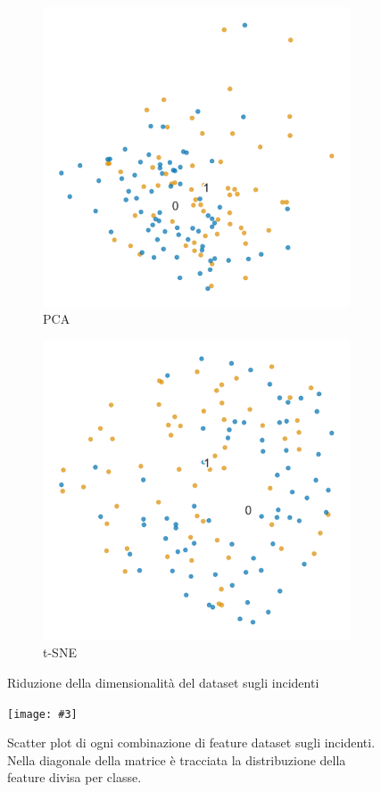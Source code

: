 \documentclass[12pt, twoside, letterpaper]{report}
\newcommand{\img}[4] {
	\begin{figure}
		\centering
		\texttt{[image: \#3]}\\
		\caption{#1}
		\label{fig:#4}
	\end{figure}
}
\begin{document}
			\begin{figure}[h]
				\begin{subfigure}[]{.5\textwidth}
					\centering
					\includegraphics[width=.7\linewidth]{pca_incidenti.png}
					\caption{PCA}
					\label{fig:pca_incidenti}
				\end{subfigure}
				\hfill
				\begin{subfigure}[]{.5\textwidth}
					\centering
					\includegraphics[width=.7\linewidth]{tsne_incidenti.png}
					\caption{t-SNE}
					\label{fig:tsne_incidenti}
				\end{subfigure}
				
				\caption{Riduzione della dimensionalità del dataset sugli incidenti}
				\label{fig:pca_tsne_incidenti}
			\end{figure}	
			\img{Scatter plot di ogni combinazione di feature dataset sugli incidenti. Nella diagonale della matrice è tracciata la distribuzione della feature divisa per classe.}{0.25}{scatter_incidenti.png}{scatter_incidenti}
 				
\end{document}
